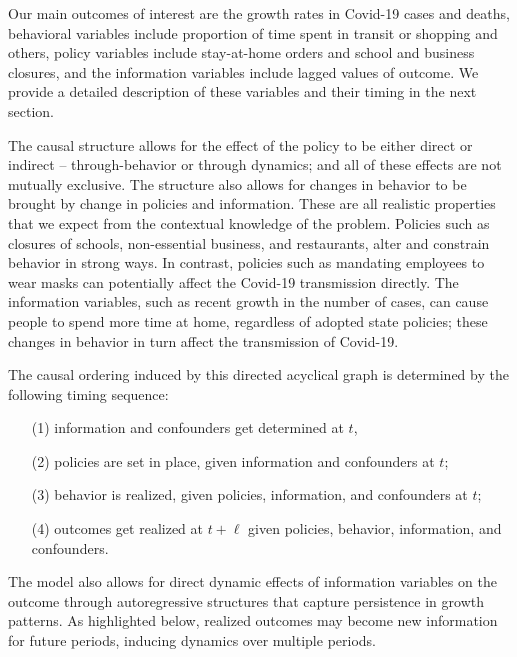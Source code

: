 \documentclass[11pt,reqno,letter]{amsart}
\theoremstyle{definition}
\begin{document}
Our main outcomes of interest are the growth rates in Covid-19 cases and deaths,  behavioral variables include proportion of time spent in transit or shopping and others, policy variables include stay-at-home orders and school and business closures, and the information variables include lagged values of outcome. We provide a detailed description of these variables and their timing in the next section.


The causal structure  allows for  the effect of the policy to be either direct or indirect -- through-behavior or through dynamics; and all of these effects are not mutually exclusive. The structure also allows for changes in behavior to be brought by change in policies and information. These are all realistic properties that we expect from the contextual knowledge of the problem. Policies such as closures of schools, non-essential business, and restaurants, alter and constrain behavior in strong ways.  In contrast, policies such as mandating employees to wear masks can potentially affect the Covid-19 transmission directly.  The information variables, such as recent growth in the number of cases, can cause people to spend more time at home, regardless of adopted state policies; these changes in behavior in turn affect the transmission of Covid-19.

The causal ordering induced by this directed acyclical graph is determined by the following
timing sequence: %
\begin{itemize}
\item[(1)]  information and confounders get determined at $t$,
\item[(2)] policies are set in place, given information and confounders at $t$;
\item[(3)] behavior is realized, given policies, information, and confounders at $t$;
\item[(4)] outcomes get realized at $t+\ell$ given policies, behavior, information, and confounders.
\end{itemize}

The model also allows for direct dynamic effects of information variables on the outcome through autoregressive structures that capture persistence in growth patterns. As  highlighted below, realized outcomes may become new information for future periods, inducing dynamics over multiple periods.
\end{document}
